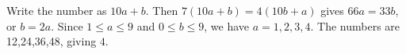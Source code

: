Write the number as $ 10a+b $. Then $ 7(10a+b)=4(10b+a)$ gives $ 66a=33b $, or $ b=2a $. Since $ 1\le a\le9 $ and $ 0\le b\le9 $, we have $ a=1,2,3,4 $. The numbers are 12,24,36,48, giving $\boxed4 $.
